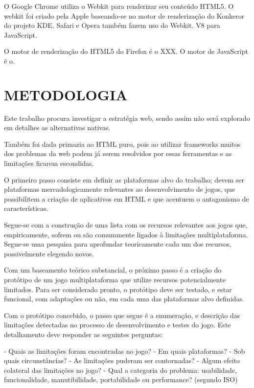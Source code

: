 \documentclass[11pt,a4paper]{article}
\begin{document}
O Google Chrome utiliza o Webkit para renderizar seu conteúdo HTML5. O
webkit foi criado pela Apple baseando-se no motor de renderização do
Konkeror do projeto KDE. Safari e Opera também fazem uso do Webkit. V8
para JavaScript.

O motor de renderização do HTML5 do Firefox é o XXX. O motor de
JavaScript é o.


\chapter{METODOLOGIA}

Este trabalho procura investigar a estratégia web, sendo assim não
será explorado em detalhes as alternativas nativas.

Também foi dada primazia ao HTML puro, pois ao utilizar frameworks
muitos dos problemas da web podem já serem resolvidos por essas
ferramentas e as limitações ficarem escondidas.


O primeiro passo consiste em definir as plataformas alvo do trabalho;
devem ser plataformas mercadologicamente relevantes ao desenvolvimento
de jogos, que possibilitem a criação de aplicativos em HTML e que
acentuem o antagonismo de características.

Segue-se com a construção de uma lista com os recursos relevantes
aos jogos que, empiricamente, sofrem ou são comummente ligados à
limitações multiplataforma. Segue-se uma pesquisa para aprofundar
teoricamente cada um dos recursos, possivelmente elegendo novos.

Com um baseamento teórico substancial, o próximo passo é a criação
do protótipo de um jogo multiplataforma que utilize recursos
potencialmente limitados. Para ser considerado pronto, o protótipo deve
ser testado, e estar funcional, com adaptações ou não, em cada uma
das plataformas alvo definidas.

Com o protótipo concebido, o passo que segue é a enumeração, e
descrição das limitações detectadas no processo de desenvolvimento e
testes do jogo. Este detalhamento deve responder as seguintes perguntas:

- Quais as limitações foram encontradas no jogo?
- Em quais plataformas?
- Sob quais circunstâncias?
- As limitações puderam ser contornadas?
- Algum efeito colateral das limitações no jogo?
- Qual a categoria do problema: usabilidade, funcionalidade,
manutibilidade, portabilidade ou performance? (segundo ISO) %

\end{document}
